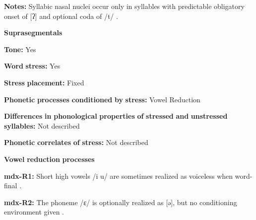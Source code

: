 \documentclass[output=paper]{langsci/langscibook}
\begin{document}
\begin{styleBody}
\textbf{Notes:} Syllabic nasal nuclei occur only in syllables with predictable obligatory onset of [ʔ] and optional coda of /t/ \citep[41]{Beachy2005}.
\end{styleBody}

\begin{styleBody}
\textbf{Suprasegmentals}
\end{styleBody}

\begin{styleBody}
\textbf{Tone:} Yes
\end{styleBody}

\begin{styleBody}
\textbf{Word} \textbf{stress:} Yes
\end{styleBody}

\begin{styleBody}
\textbf{Stress} \textbf{placement:} Fixed
\end{styleBody}

\begin{styleBody}
\textbf{Phonetic} \textbf{processes} \textbf{conditioned} \textbf{by} \textbf{stress:} Vowel Reduction
\end{styleBody}

\begin{styleBody}
\textbf{Differences} \textbf{in} \textbf{phonological} \textbf{properties} \textbf{of} \textbf{stressed} \textbf{and} \textbf{unstressed} \textbf{syllables:} Not described
\end{styleBody}

\begin{styleBody}
\textbf{Phonetic} \textbf{correlates} \textbf{of} \textbf{stress:} Not described
\end{styleBody}

\begin{styleBody}
\textbf{Vowel} \textbf{reduction} \textbf{processes}
\end{styleBody}

\begin{styleBody}
\textbf{mdx-R1:} Short high vowels /i u/ are sometimes realized as voiceless when word-final \citep[35-6]{Beachy2005}.
\end{styleBody}

\begin{styleBody}
\textbf{mdx-R2:} The phoneme /ɛ/ is optionally realized as [ə], but no conditioning environment given \citep[37]{Beachy2005}.
\end{styleBody}
\end{document}
